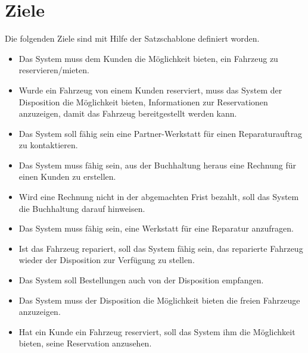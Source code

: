 \section{Ziele}
Die folgenden Ziele sind mit Hilfe der Satzschablone definiert worden.
\begin{itemize}
\item Das System muss dem Kunden die Möglichkeit bieten, ein Fahrzeug zu reservieren/mieten.
%
\item Wurde ein Fahrzeug von einem Kunden reserviert, muss das System der Disposition die Möglichkeit bieten, Informationen zur Reservationen anzuzeigen, damit das Fahrzeug bereitgestellt werden kann.
%
\item Das System soll fähig sein eine Partner-Werkstatt für einen Reparaturauftrag zu kontaktieren.
%
\item Das System muss fähig sein, aus der Buchhaltung heraus eine Rechnung für einen Kunden zu erstellen.
%
\item Wird eine Rechnung nicht in der abgemachten Frist bezahlt, soll das System die Buchhaltung darauf hinweisen. 
%
\item Das System muss fähig sein, eine Werkstatt für eine Reparatur anzufragen.
%
\item Ist das Fahrzeug repariert, soll das System fähig sein, das reparierte Fahrzeug wieder der Disposition zur Verfügung  zu stellen.
%
\item Das System soll Bestellungen auch von der Disposition empfangen.
%
\item Das System muss der Disposition die Möglichkeit bieten die freien Fahrzeuge anzuzeigen.
%
\item Hat ein Kunde ein Fahrzeug reserviert, soll das System ihm die Möglichkeit bieten, seine Reservation anzusehen.
\end{itemize}
\newpage
